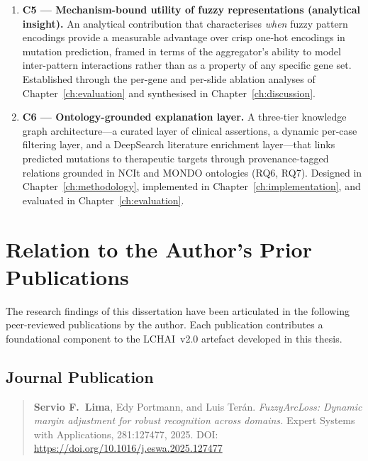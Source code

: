 \begin{enumerate}
    \item \textbf{C5 --- Mechanism-bound utility of fuzzy
    representations (analytical insight).}
    An analytical contribution that characterises \emph{when} fuzzy
    pattern encodings provide a measurable advantage over crisp
    one-hot encodings in mutation prediction, framed in terms of the
    aggregator's ability to model inter-pattern interactions rather
    than as a property of any specific gene set.
    Established through the per-gene and per-slide ablation analyses
    of Chapter~\ref{ch:evaluation} and synthesised in
    Chapter~\ref{ch:discussion}.

    \item \textbf{C6 --- Ontology-grounded explanation layer.}
    A three-tier knowledge graph architecture---a curated layer of
    clinical assertions, a dynamic per-case filtering layer, and a
    DeepSearch literature enrichment layer---that links predicted
    mutations to therapeutic targets through provenance-tagged
    relations grounded in NCIt and MONDO ontologies (RQ6, RQ7).
    Designed in Chapter~\ref{ch:methodology}, implemented in
    Chapter~\ref{ch:implementation}, and evaluated in
    Chapter~\ref{ch:evaluation}.
\end{enumerate}


\section{Relation to the Author's Prior Publications}
\label{sec:continuation_prior_work}

The research findings of this dissertation have been articulated in
the following peer-reviewed publications by the author.
Each publication contributes a foundational component to the
LCHAI~v2.0 artefact developed in this thesis.

\subsection*{Journal Publication}

\begin{quote}
\textbf{Servio F.\ Lima}, Edy Portmann, and Luis Ter\'{a}n.
\emph{FuzzyArcLoss: Dynamic margin adjustment for robust recognition
across domains.}
Expert Systems with Applications, 281:127477, 2025.
DOI: \url{https://doi.org/10.1016/j.eswa.2025.127477}
\end{quote}

